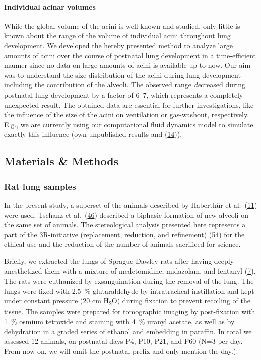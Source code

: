 \documentclass[
  american,
]{article}
\begin{document}
\hypertarget{individual-acinar-volumes}{%
\paragraph{Individual acinar volumes}\label{individual-acinar-volumes}}

While the global volume of the acini is well known and studied, only little is known about the range of the volume of individual acini throughout lung development.
We developed the hereby presented method to analyze large amounts of acini over the course of postnatal lung development in a time-efficient manner since no data on large amounts of acini is available up to now.
Our aim was to understand the size distribution of the acini during lung development including the contribution of the alveoli.
The observed range \emph{de}creased during postnatal lung development by a factor of 6--7, which represents a completely unexpected result.
The obtained data are essential for further investigations, like the influence of the size of the acini on ventilation or gas-washout, respectively.
E.g., we are currently using our computational fluid dynamics model to simulate exactly this influence (own unpublished results and (\protect\hyperlink{ref-eb0gk6VO}{14})).

\hypertarget{materials-methods}{%
\subsection{Materials \& Methods}\label{materials-methods}}

\hypertarget{rat-lung-samples}{%
\subsubsection{Rat lung samples}\label{rat-lung-samples}}

In the present study, a superset of the animals described by Haberthür et al.~(\protect\hyperlink{ref-7YLeeyu}{11}) were used.
Tschanz et al.~(\protect\hyperlink{ref-wnl86DEM}{46}) described a biphasic formation of new alveoli on the same set of animals.
The stereological analysis presented here represents a part of the 3R-initiative (replacement, reduction, and refinement) (\protect\hyperlink{ref-199ALtdJt}{54}) for the ethical use and the reduction of the number of animals sacrificed for science.

Briefly, we extracted the lungs of Sprague-Dawley rats after having deeply anesthetized them with a mixture of medetomidine, midazolam, and fentanyl (\protect\hyperlink{ref-IdRLVLjl}{7}).
The rats were euthanized by exsanguination during the removal of the lung.
The lungs were fixed with 2.5~\% glutaraldehyde by intratracheal instillation and kept under constant pressure (20 cm H\textsubscript{2}O) during fixation to prevent recoiling of the tissue.
The samples were prepared for tomographic imaging by post-fixation with 1~\% osmium tetroxide and staining with 4~\% uranyl acetate, as well as by dehydration in a graded series of ethanol and embedding in paraffin.
In total we assessed 12 animals, on postnatal days P4, P10, P21, and P60 (N=3 per day.
From now on, we will omit the postnatal prefix and only mention the day.).
\end{document}
